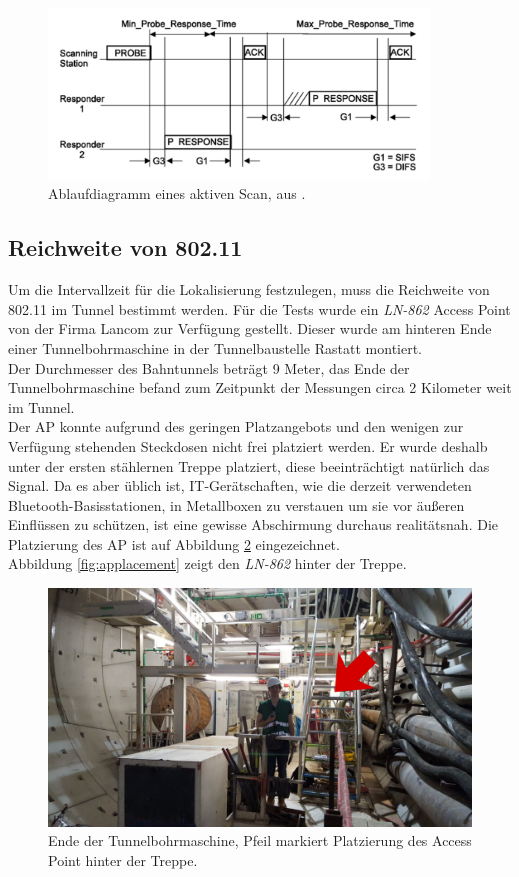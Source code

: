 \begin{figure}[h]
  \centering
	\includegraphics[width=0.9\textwidth]{images/activescan.png}
  \caption{Ablaufdiagramm eines aktiven Scan, aus \cite{ieee2012active}.}
  \label{fig:activescan}
\end{figure}


\subsection{Reichweite von 802.11}
\label{ch:phase1:sec:rangewlan}
Um die Intervallzeit für die Lokalisierung festzulegen, muss die Reichweite von 802.11 im Tunnel bestimmt werden.
Für die Tests wurde ein \emph{LN-862} Access Point von der Firma Lancom zur Verfügung gestellt.
Dieser wurde am hinteren Ende einer Tunnelbohrmaschine in der Tunnelbaustelle Rastatt montiert.\\
Der Durchmesser des Bahntunnels beträgt 9 Meter, das Ende der Tunnelbohrmaschine befand zum Zeitpunkt der Messungen circa 2 Kilometer weit im Tunnel.\\
Der AP konnte aufgrund des geringen Platzangebots und den wenigen zur Verfügung stehenden Steckdosen nicht frei platziert werden.
Er wurde deshalb unter der ersten stählernen Treppe platziert, diese beeinträchtigt natürlich das Signal.
Da es aber üblich ist, IT-Gerätschaften, wie die derzeit verwendeten Bluetooth-Basisstationen, in Metallboxen zu verstauen um sie vor äußeren Einflüssen zu schützen, ist eine gewisse Abschirmung durchaus realitätsnah.
Die Platzierung des AP ist auf Abbildung \ref{fig:tunnelmark} eingezeichnet.\\
Abbildung \ref{fig:applacement} zeigt den \emph{LN-862} hinter der Treppe.

\begin{figure}[h]
  \centering
	\includegraphics[width=\textwidth]{images/tunnelmark.png}
  \caption{Ende der Tunnelbohrmaschine, Pfeil markiert Platzierung des Access Point hinter der Treppe.}
  \label{fig:tunnelmark}
\end{figure}

